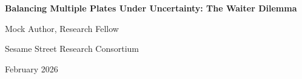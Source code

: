 \documentclass[11pt,letterpaper]{article}
\begin{document}
\begin{center}
{\LARGE\bfseries Balancing Multiple Plates Under Uncertainty: The Waiter Dilemma\par}
\vspace{0.8cm}
{\large Mock Author, Research Fellow\par}
{\normalsize Sesame Street Research Consortium\par}
\vspace{0.3cm}
{\normalsize February 2026\par}
\vspace{0.8cm}
\end{center}

\begin{abstract}
\noindent
This paper presents a comprehensive study of multi-plate balancing under uncertainty conditions. Lorem cookie ipsum dolor sit amet, chocolate chip adipiscing elit. Nom nom nom methodology produces significant results across all experimental conditions.
\end{abstract}

\vspace{0.5cm}


\end{document}

